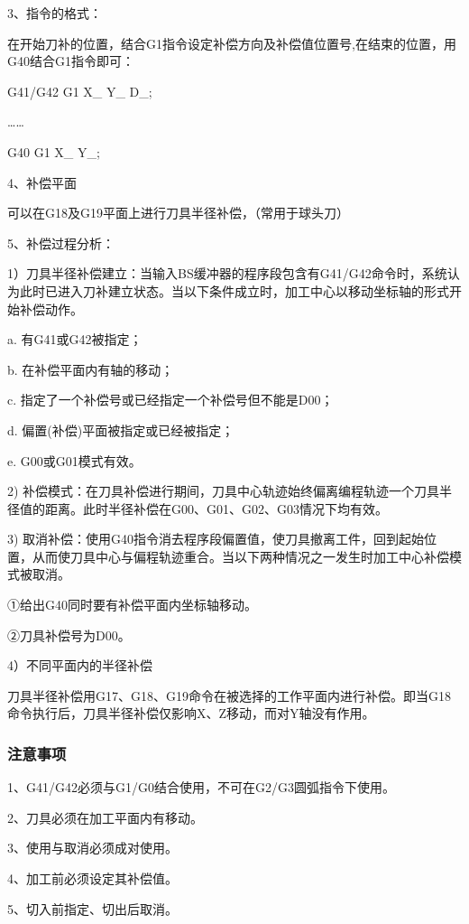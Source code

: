 3、指令的格式：

在开始刀补的位置，结合G1指令设定补偿方向及补偿值位置号,在结束的位置，用G40结合G1指令即可：

G41/G42 G1 X\_ Y\_  D\_;

……

G40 G1 X\_ Y\_;

4、补偿平面

可以在G18及G19平面上进行刀具半径补偿，（常用于球头刀）

5、补偿过程分析：

1）刀具半径补偿建立：当输入BS缓冲器的程序段包含有G41/G42命令时，系统认为此时已进入刀补建立状态。当以下条件成立时，加工中心以移动坐标轴的形式开始补偿动作。 

a. 有G41或G42被指定； 

b. 在补偿平面内有轴的移动； 

c. 指定了一个补偿号或已经指定一个补偿号但不能是D00；
 
d. 偏置(补偿)平面被指定或已经被指定； 

e. G00或G01模式有效。 

2) 补偿模式：在刀具补偿进行期间，刀具中心轨迹始终偏离编程轨迹一个刀具半径值的距离。此时半径补偿在G00、G01、G02、G03情况下均有效。 

3) 取消补偿：使用G40指令消去程序段偏置值，使刀具撤离工件，回到起始位置，从而使刀具中心与偏程轨迹重合。当以下两种情况之一发生时加工中心补偿模式被取消。

①给出G40同时要有补偿平面内坐标轴移动。

②刀具补偿号为D00。

4）不同平面内的半径补偿 

刀具半径补偿用G17、G18、G19命令在被选择的工作平面内进行补偿。即当G18命令执行后，刀具半径补偿仅影响X、Z移动，而对Y轴没有作用。


\subsubsection{注意事项}
1、G41/G42必须与G1/G0结合使用，不可在G2/G3圆弧指令下使用。

2、刀具必须在加工平面内有移动。

3、使用与取消必须成对使用。

4、加工前必须设定其补偿值。

5、切入前指定、切出后取消。


